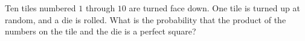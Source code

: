 Ten tiles numbered $1$ through $10$ are turned face down. One tile is turned up at random, and a die is rolled. What is the probability that the product of the numbers on the tile and the die is a perfect square?
